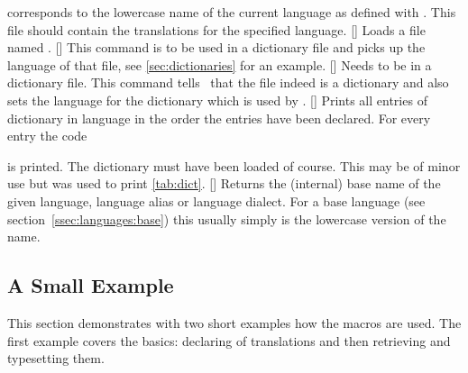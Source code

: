 \documentclass[load-preamble+,babel-options={french,spanish,ngerman,english}]{cnltx-doc}
\begin{document}
\begin{commands}
   corresponds to the lowercase name of the current language as defined with
   .  This file should contain the translations for the
   specified language.
 []
   Loads a file named .
 []
   This command is to be used in a dictionary file and picks up the language
   of that file, see \cref{sec:dictionaries} for an example.
 []
   Needs to be in a dictionary file.  This command tells \translations\ that
   the file indeed is a dictionary and also sets the language for the
   dictionary which is used by .
 \expandable{}%
   []
   Prints all entries of dictionary  in
   language  in the order the entries have been declared.  For
   every entry the code\par
   \par
   is printed.  The dictionary must have been loaded of course.  This may be
   of minor use but was used to print \cref{tab:dict}.
 \expandable{}[]
   Returns the (internal) base name of the given language,
   language alias or language dialect.  For a base language
   (see section~\ref{ssec:languages:base}) this usually simply is the
   lowercase version of the name.
\end{commands}

\subsection{A Small Example}
This section demonstrates with two short examples how the macros are used.
The first example covers the basics: declaring of translations and then
retrieving and typesetting them.

\begin{example}
  
  \SaveTranslation{}
  \SaveTranslationFor{}

   \kitchen\ 
  \cuisine
\end{example}
\end{document}
